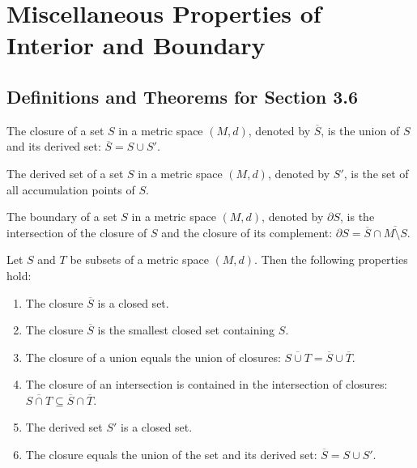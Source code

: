 \section{Miscellaneous Properties of Interior and Boundary}

\subsection*{Definitions and Theorems for Section 3.6}

\begin{definition}
The closure of a set $S$ in a metric space $(M,d)$, denoted by $\overline{S}$, is the union of $S$ and its derived set: $\overline{S} = S \cup S'$.
\end{definition}

\begin{definition}
The derived set of a set $S$ in a metric space $(M,d)$, denoted by $S'$, is the set of all accumulation points of $S$.
\end{definition}

\begin{definition}
The boundary of a set $S$ in a metric space $(M,d)$, denoted by $\partial S$, is the intersection of the closure of $S$ and the closure of its complement: $\partial S = \overline{S} \cap \overline{M \setminus S}$.
\end{definition}

\begin{theorem}
Let $S$ and $T$ be subsets of a metric space $(M,d)$. Then the following properties hold:
\begin{enumerate}
\item The closure $\overline{S}$ is a closed set.
\item The closure $\overline{S}$ is the smallest closed set containing $S$.
\item The closure of a union equals the union of closures: $\overline{S \cup T} = \overline{S} \cup \overline{T}$.
\item The closure of an intersection is contained in the intersection of closures: $\overline{S \cap T} \subseteq \overline{S} \cap \overline{T}$.
\item The derived set $S'$ is a closed set.
\item The closure equals the union of the set and its derived set: $\overline{S} = S \cup S'$.
\end{enumerate}
\end{theorem}

